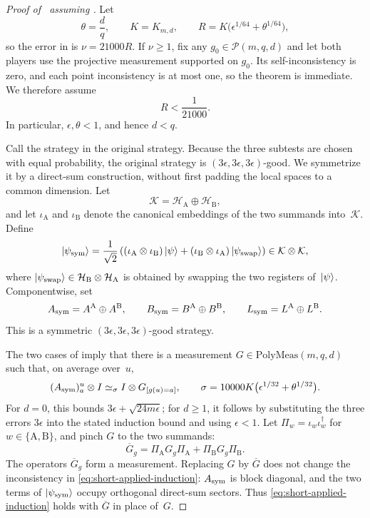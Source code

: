 \documentclass[11pt]{article}
\theoremstyle{definition}
\newcommand{\eps}{\epsilon}
\newcommand{\calH}{\mathcal{H}}
\newcommand{\calP}{\mathcal{P}}
\newcommand{\polyfunc}[3]{\calP(#1, #2, #3)}
\newcommand{\polymeas}[3]{\mathrm{PolyMeas}(#1, #2, #3)}
\begin{document}
\begin{proof}[Proof of~ assuming ]
Let
\[
 \theta=\frac dq,\qquad
 K=K_{m,d},\qquad
 R=K\bigl(\eps^{1/64}+\theta^{1/64}\bigr),
\]
so the error in  is \(\nu=21000R\).
If \(\nu\geq1\), fix any \(g_0\in\polyfunc{m}{q}{d}\) and let both
players use the projective measurement supported on \(g_0\).  Its
self-inconsistency is zero, and each point inconsistency is at most
one, so the theorem is immediate.  We therefore assume
\begin{equation}\label{eq:nontrivial-main-error}
 R<\frac1{21000}.
\end{equation}
In particular, \(\eps,\theta<1\), and hence \(d<q\).

Call the strategy in  the original strategy.
Because the three subtests are chosen with equal probability, the
original strategy is \((3\eps,3\eps,3\eps)\)-good.  We symmetrize it
by a direct-sum construction, without first padding the local spaces
to a common dimension.  Let
\[
 \mathcal K=\calH_{\mathrm A}\oplus\calH_{\mathrm B},
\]
and let \(\iota_{\mathrm A}\) and \(\iota_{\mathrm B}\) denote the
canonical embeddings of the two summands into~\(\mathcal K\).  Define
\[
 \ket{\psi_{\rm sym}}
 =\frac1{\sqrt2}\left(
   (\iota_{\mathrm A}\otimes\iota_{\mathrm B})\ket\psi
   +(\iota_{\mathrm B}\otimes\iota_{\mathrm A})
      \ket{\psi_{\rm swap}}\right)\in\mathcal K\otimes\mathcal K,
\]
where \(\ket{\psi_{\rm swap}}\in
\calH_{\mathrm B}\otimes\calH_{\mathrm A}\) is obtained by swapping
the two registers of~\(\ket\psi\).  Componentwise, set
\[
 A_{\rm sym}=A^{\mathrm A}\oplus A^{\mathrm B},\qquad
 B_{\rm sym}=B^{\mathrm A}\oplus B^{\mathrm B},\qquad
 L_{\rm sym}=L^{\mathrm A}\oplus L^{\mathrm B}.
\]
This is a symmetric \((3\eps,3\eps,3\eps)\)-good strategy.

The two cases of  imply that there is a
measurement \(G\in\polymeas{m}{q}{d}\) such that, on average over~\(u\),
\begin{equation}\label{eq:short-applied-induction}
 (A_{\rm sym})^u_a\otimes I
 \simeq_\sigma I\otimes G_{[g(u)=a]},
 \qquad
 \sigma=10000K\bigl(\eps^{1/32}+\theta^{1/32}\bigr).
\end{equation}
For \(d=0\), this bounds \(3\eps+\sqrt{24m\eps}\); for \(d\geq1\),
it follows by substituting the three errors \(3\eps\) into the stated
induction bound and using \(\eps<1\).
Let \(\Pi_w=\iota_w\iota_w^\dagger\) for
\(w\in\{\mathrm A,\mathrm B\}\), and pinch \(G\) to the two summands:
\[
 \overline G_g=\Pi_{\mathrm A}G_g\Pi_{\mathrm A}
               +\Pi_{\mathrm B}G_g\Pi_{\mathrm B}.
\]
The operators \(\overline G_g\) form a measurement.  Replacing \(G\)
by \(\overline G\) does not change the inconsistency in
\eqref{eq:short-applied-induction}: \(A_{\rm sym}\) is block diagonal,
and the two terms of \(\ket{\psi_{\rm sym}}\) occupy orthogonal
direct-sum sectors.  Thus \eqref{eq:short-applied-induction} holds with
\(\overline G\) in place of~\(G\).


\end{proof}
\end{document}
